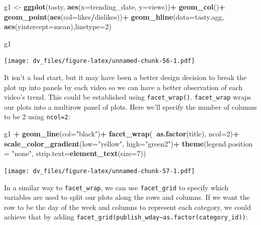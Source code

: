 \documentclass[]{article}
\newenvironment{Shaded}{\begin{snugshade}}{\end{snugshade}}
\newcommand{\DataTypeTok}[1]{\textcolor[rgb]{0.13,0.29,0.53}{#1}}
\newcommand{\DecValTok}[1]{\textcolor[rgb]{0.00,0.00,0.81}{#1}}
\newcommand{\KeywordTok}[1]{\textcolor[rgb]{0.13,0.29,0.53}{\textbf{#1}}}
\newcommand{\NormalTok}[1]{#1}
\newcommand{\OperatorTok}[1]{\textcolor[rgb]{0.81,0.36,0.00}{\textbf{#1}}}
\newcommand{\StringTok}[1]{\textcolor[rgb]{0.31,0.60,0.02}{#1}}
\begin{document}
\begin{Shaded}
\begin{Highlighting}[]
\NormalTok{g1 <-}\StringTok{ }\KeywordTok{ggplot}\NormalTok{(tasty, }\KeywordTok{aes}\NormalTok{(}\DataTypeTok{x=}\NormalTok{trending_date, }\DataTypeTok{y=}\NormalTok{views))}\OperatorTok{+}
\StringTok{  }\KeywordTok{geom_col}\NormalTok{()}\OperatorTok{+}
\StringTok{  }\KeywordTok{geom_point}\NormalTok{(}\KeywordTok{aes}\NormalTok{(}\DataTypeTok{col=}\NormalTok{likes}\OperatorTok{/}\NormalTok{dislikes))}\OperatorTok{+}
\StringTok{  }\KeywordTok{geom_hline}\NormalTok{(}\DataTypeTok{data=}\NormalTok{tasty.agg, }\KeywordTok{aes}\NormalTok{(}\DataTypeTok{yintercept=}\NormalTok{mean),}\DataTypeTok{linetype=}\DecValTok{2}\NormalTok{)}

\NormalTok{g1}
\end{Highlighting}
\end{Shaded}

\texttt{[image: dv\_files/figure-latex/unnamed-chunk-56-1.pdf]}

It isn't a bad start, but it may have been a better design decision to
break the plot up into panels by each video so we can have a better
observation of each video's trend. This could be established using
\texttt{facet\_wrap()}. \texttt{facet\_wrap} wraps our plots into a
multirow panel of plots. Here we'll specify the number of columns to be
2 using \texttt{ncol=2}:

\begin{Shaded}
\begin{Highlighting}[]
\NormalTok{g1 }\OperatorTok{+}
\StringTok{  }\KeywordTok{geom_line}\NormalTok{(}\DataTypeTok{col=}\StringTok{"black"}\NormalTok{)}\OperatorTok{+}
\StringTok{  }\KeywordTok{facet_wrap}\NormalTok{(}\OperatorTok{~}\KeywordTok{as.factor}\NormalTok{(title), }\DataTypeTok{ncol=}\DecValTok{2}\NormalTok{)}\OperatorTok{+}
\StringTok{  }\KeywordTok{scale_color_gradient}\NormalTok{(}\DataTypeTok{low=}\StringTok{"yellow"}\NormalTok{, }\DataTypeTok{high=}\StringTok{"green2"}\NormalTok{)}\OperatorTok{+}
\StringTok{  }\KeywordTok{theme}\NormalTok{(}\DataTypeTok{legend.position =} \StringTok{"none"}\NormalTok{, }
        \DataTypeTok{strip.text=}\KeywordTok{element_text}\NormalTok{(}\DataTypeTok{size=}\DecValTok{7}\NormalTok{))}
\end{Highlighting}
\end{Shaded}

\texttt{[image: dv\_files/figure-latex/unnamed-chunk-57-1.pdf]}

In a similar way to \texttt{facet\_wrap}, we can use
\texttt{facet\_grid} to specify which variables are used to split our
plots along the rows and columns. If we want the row to be the day of
the week and columns to represent each category, we could achieve that
by adding
\texttt{facet\_grid(publish\_wday\textasciitilde{}as.factor(category\_id))}:
\end{document}
